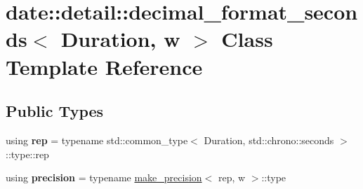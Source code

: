 \hypertarget{classdate_1_1detail_1_1decimal__format__seconds}{}\section{date\+::detail\+::decimal\+\_\+format\+\_\+seconds$<$ Duration, w $>$ Class Template Reference}
\label{classdate_1_1detail_1_1decimal__format__seconds}
\subsection*{Public Types}
\begin{DoxyCompactItemize}
\item 
\mbox{\label{classdate_1_1detail_1_1decimal__format__seconds_adb3f59f88de171f071d23b11c2555bdd}} 
using {\bfseries rep} = typename std\+::common\+\_\+type$<$ Duration, std\+::chrono\+::seconds $>$\+::type\+::rep
\item 
\mbox{\label{classdate_1_1detail_1_1decimal__format__seconds_afffa0a7bc591178fbf92a535ea7ef9b6}} 
using {\bfseries precision} = typename \mbox{\hyperlink{structdate_1_1detail_1_1make__precision}{make\+\_\+precision}}$<$ rep, w $>$\+::type
\end{DoxyCompactItemize}
